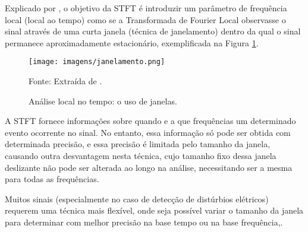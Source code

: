 \par 
Explicado por \cite{OLI07}, o objetivo da STFT é introduzir um parâmetro de frequência local (local ao tempo) como se a Transformada de Fourier Local observasse o sinal através de uma curta janela (técnica de janelamento) dentro da qual o sinal permanece aproximadamente estacionário, exemplificada na Figura \ref{fig:janelamento}.
\begin{figure}[!h]
\begin{center}
\caption{Análise local no tempo: o uso de janelas.}
\texttt{[image: imagens/janelamento.png]}
\par{\small Fonte: Extraída de \cite{OLI07}.}
\label{fig:janelamento}
\end{center}
\end{figure}
\par
A \ac{STFT} fornece informações sobre quando e a que frequências um determinado evento ocorrente no sinal. No entanto, essa informação só pode ser obtida com determinada precisão, e essa precisão é limitada pelo tamanho da janela, causando outra desvantagem nesta técnica, cujo tamanho fixo dessa janela deslizante não pode ser alterada ao longo na análise, necessitando ser a mesma para todas as frequências. 
\par
Muitos sinais (especialmente no caso de detecção de distúrbios elétricos) requerem uma técnica mais flexível, onde seja possível variar o tamanho da janela para determinar com melhor precisão na base tempo ou na base frequência,\citep{MEN08}.
